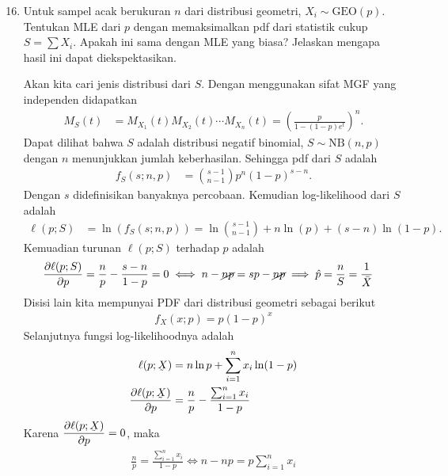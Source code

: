 \documentclass{exam}
\newcommand{\del}{\partial}
\begin{document}

\begin{enumerate}
    \setcounter{enumi}{15}
    \item Untuk sampel acak berukuran $n$ dari distribusi geometri, $X_i\sim \text{GEO}(p)$. Tentukan MLE dari $p$ dengan memaksimalkan pdf dari statistik cukup $S=\sum X_i$. Apakah ini sama dengan MLE yang biasa? Jelaskan mengapa hasil ini dapat diekspektasikan.
    \begin{solution}
        Akan kita cari jenis distribusi dari $S$. Dengan menggunakan sifat MGF yang independen didapatkan
        \begin{align*}
            M_{S}(t) &= M_{X_1}(t)M_{X_2}(t)\cdots M_{X_n}(t) = \left(\frac{p}{1-(1-p)e^t}\right)^n.
        \end{align*}
        Dapat dilihat bahwa $S$ adalah distribusi negatif binomial, $S\sim \text{NB}(n,p)$ dengan $n$ menunjukkan jumlah keberhasilan. Sehingga pdf dari $S$ adalah 
        \begin{align*}
            f_S(s;n,p) &= \binom{s-1}{n-1}p^n(1-p)^{s-n}.
        \end{align*}
        Dengan $s$ didefinisikan banyaknya percobaan. Kemudian log-likelihood dari $S$ adalah
        \begin{align*}
            \ell(p;S) &= \ln\left(f_S(s;n, p)\right) = \ln\binom{s-1}{n-1} + n\ln(p) + (s-n)\ln(1-p).
        \end{align*}
        Kemuadian turunan $\ell(p;S)$ terhadap $p$ adalah
        \begin{align*}
            \frac{\del \ell(p;S)}{\del p} &= \frac{n}{p} - \frac{s-n}{1-p} = 0 \iff n-\cancel{np}=sp-\cancel{np}\implies \hat{p}=\frac{n}{S}=\frac{1}{\bar{X}}
        \end{align*}
        Disisi lain kita mempunyai PDF dari distribusi geometri sebagai berikut
        \begin{align*}
            f_X(x;p)=p(1-p)^x
        \end{align*}
        Selanjutnya fungsi log-likelihoodnya adalah
        \begin{align*}
            \ell(p;\underaccent{\tilde}{X}) &= n\ln p + \sum_{i=1}^{n}x_i\ln (1-p)\\
            \frac{\del \ell(p;\underaccent{\tilde}{X})}{\del p} &= \frac{n}{p}-\frac{\sum_{i=1}^{n}x_i}{1-p}
        \end{align*}
        Karena $\displaystyle \frac{\del \ell(p;\underaccent{\tilde}{X})}{\del p}=0$, maka 
        \begin{align*}
            \frac{n}{p}=\frac{\sum_{i=1}^{n}x_i}{1-p}\iff n-np=p\sum_{i=1}^{n}x_i
        \end{align*}


\end{solution}
\end{enumerate}
\end{document}
